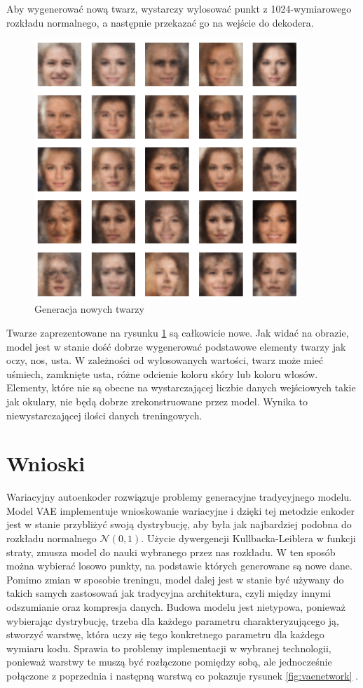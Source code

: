 \documentclass[a4paper,12pt,oneside]{book} %
\begin{document}
Aby wygenerować nową twarz, wystarczy wylosować punkt z 1024-wymiarowego rozkładu normalnego, a następnie przekazać go na wejście do dekodera.
\begin{figure}[h!]
	\centering\includegraphics[width=10cm]{generatedfaces.png}
	\caption{Generacja nowych twarzy}
	\label{fig:facegenvae}
\end{figure}

Twarze zaprezentowane na rysunku \ref{fig:facegenvae} są całkowicie nowe. Jak widać na obrazie, model jest w stanie dość dobrze wygenerować podstawowe elementy twarzy jak oczy, nos, usta. W zależności od wylosowanych wartości, twarz może mieć uśmiech, zamknięte usta, różne odcienie koloru skóry lub koloru włosów. Elementy, które nie są obecne na wystarczającej liczbie danych wejściowych takie jak okulary, nie będą dobrze zrekonstruowane przez model. Wynika to niewystarczającej ilości danych treningowych.


\newpage
\section{Wnioski}
Wariacyjny autoenkoder rozwiązuje problemy generacyjne tradycyjnego modelu. Model VAE implementuje wnioskowanie wariacyjne i dzięki tej metodzie enkoder jest w stanie przybliżyć swoją dystrybucję, aby była jak najbardziej podobna do rozkładu normalnego $\mathcal{N}(0, 1)$. Użycie dywergencji Kullbacka-Leiblera w funkcji straty, zmusza model do nauki wybranego przez nas rozkładu. W ten sposób można wybierać losowo punkty, na podstawie których generowane są nowe dane. Pomimo zmian w sposobie treningu, model dalej jest w stanie być używany do takich samych zastosowań jak tradycyjna architektura, czyli między innymi odszumianie oraz kompresja danych. Budowa modelu jest nietypowa, ponieważ wybierając dystrybucję, trzeba dla każdego parametru charakteryzującego ją, stworzyć warstwę, która uczy się tego konkretnego parametru dla każdego wymiaru kodu. Sprawia to problemy implementacji w wybranej technologii, ponieważ warstwy te muszą być rozłączone pomiędzy sobą, ale jednocześnie połączone z poprzednia i następną warstwą co pokazuje rysunek \ref{fig:vaenetwork} \cite{tikzvae}. 
\end{document}
